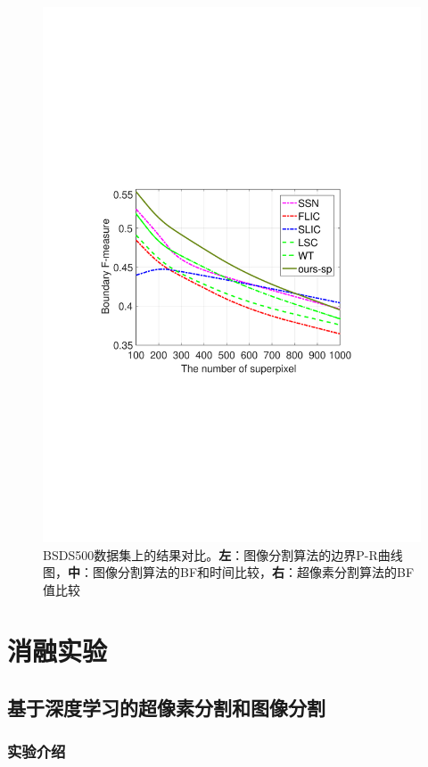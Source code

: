 \begin{figure}[h]
{\begin{minipage}[b]{0.3\linewidth}
\includegraphics[width=1\linewidth]{figures/img/Chart/fig1_3.pdf}
\end{minipage}}
\caption{BSDS500数据集上的结果对比。\textbf{左}：图像分割算法的边界P-R曲线图，\textbf{中}：图像分割算法的BF和时间比较，\textbf{右}：超像素分割算法的BF值比较}
\label{Fig5.1}
\end{figure}

\section{消融实验}

\subsection{基于深度学习的超像素分割和图像分割}
\subsubsection{实验介绍}

